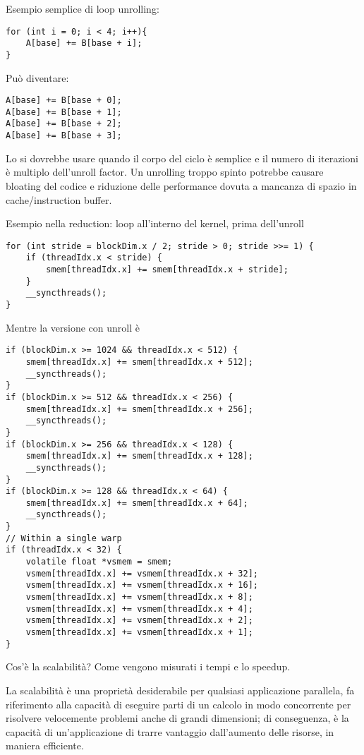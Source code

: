 \begin{questions}
\begin{solution}
    	Esempio semplice di loop unrolling: 
    	\begin{verbatim}
for (int i = 0; i < 4; i++){
    A[base] += B[base + i];
}
    	\end{verbatim}
    	Può diventare:
    	\begin{verbatim}
A[base] += B[base + 0];
A[base] += B[base + 1];
A[base] += B[base + 2];
A[base] += B[base + 3];
    	\end{verbatim}
    	
    	Lo si dovrebbe usare quando il corpo del ciclo è semplice e il numero di iterazioni è multiplo dell'unroll factor. Un unrolling troppo spinto potrebbe causare bloating del codice e riduzione delle performance dovuta a mancanza di spazio in cache/instruction buffer.
        
        Esempio nella reduction: loop all'interno del kernel, prima dell'unroll
        \begin{verbatim}
for (int stride = blockDim.x / 2; stride > 0; stride >>= 1) {
    if (threadIdx.x < stride) {
        smem[threadIdx.x] += smem[threadIdx.x + stride];
    }
    __syncthreads();
}
        \end{verbatim}
        
        Mentre la versione con unroll è
        \begin{verbatim}
if (blockDim.x >= 1024 && threadIdx.x < 512) {
    smem[threadIdx.x] += smem[threadIdx.x + 512];
    __syncthreads();
}
if (blockDim.x >= 512 && threadIdx.x < 256) {
    smem[threadIdx.x] += smem[threadIdx.x + 256];
    __syncthreads();
}
if (blockDim.x >= 256 && threadIdx.x < 128) {
    smem[threadIdx.x] += smem[threadIdx.x + 128];
    __syncthreads();
}
if (blockDim.x >= 128 && threadIdx.x < 64) {
    smem[threadIdx.x] += smem[threadIdx.x + 64];
    __syncthreads();
}
// Within a single warp
if (threadIdx.x < 32) {
    volatile float *vsmem = smem;
    vsmem[threadIdx.x] += vsmem[threadIdx.x + 32];
    vsmem[threadIdx.x] += vsmem[threadIdx.x + 16];
    vsmem[threadIdx.x] += vsmem[threadIdx.x + 8];
    vsmem[threadIdx.x] += vsmem[threadIdx.x + 4];
    vsmem[threadIdx.x] += vsmem[threadIdx.x + 2];
    vsmem[threadIdx.x] += vsmem[threadIdx.x + 1];
}
        \end{verbatim}
    \end{solution}
    
    \question Cos'è la scalabilità? Come vengono misurati i tempi e lo speedup.
    
    \begin{solution}
    	La scalabilità è una proprietà desiderabile per qualsiasi applicazione parallela, fa riferimento alla capacità di eseguire parti di un calcolo in modo concorrente per risolvere velocemente problemi anche di grandi dimensioni; di conseguenza, è la capacità di un'applicazione di trarre vantaggio dall'aumento delle risorse, in maniera efficiente.
    	

\end{solution}
\end{questions}
